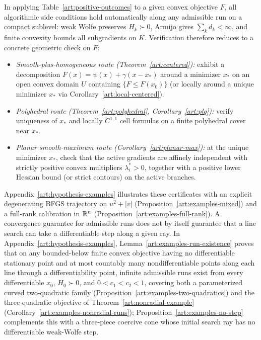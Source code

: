 In applying Table~\ref{art:positive-outcomes} to a given convex objective $F$,
all algorithmic side conditions hold automatically along any admissible run on a
compact sublevel: weak Wolfe preserves $H_k\succ0$, Armijo gives
$\sum_kd_k<\infty$, and finite convexity bounds all subgradients on $K$.
Verification therefore reduces to a concrete geometric check on $F$:
\begin{itemize}
\item \emph{Smooth-plus-homogeneous route (Theorem~\ref{art:centered}):} exhibit
a decomposition $F(x)=\psi(x)+\gamma(x-x_*)$ around a minimizer $x_*$ on an open
convex domain $U$ containing $\{F\le F(x_0)\}$ (or locally around a unique
minimizer $x_*$ via Corollary~\ref{art:local-centered}).
\item \emph{Polyhedral route (Theorem~\ref{art:polyhedral}, Corollary~\ref{art:plq}):}
verify uniqueness of $x_*$ and locally $C^{1,1}$ cell formulas on a finite
polyhedral cover near $x_*$.
\item \emph{Planar smooth-maximum route (Corollary~\ref{art:planar-max}):} at
the unique minimizer $x_*$, check that the active gradients are affinely
independent with strictly positive convex multipliers $\lambda_i^*>0$, together
with a positive lower Hessian bound (or strict contours) on the active branches.
\end{itemize}

Appendix~\ref{art:hypothesis-examples} illustrates these certificates with an
explicit degenerating BFGS trajectory on $u^2+|v|$
(Proposition~\ref{art:examples-mixed}) and a full-rank calibration in $\mathbb R^n$
(Proposition~\ref{art:examples-full-rank}). A convergence guarantee for
admissible runs does not by itself guarantee that a line search can take a
differentiable step along a given ray. In Appendix~\ref{art:hypothesis-examples},
Lemma~\ref{art:examples-run-existence} proves that on any bounded-below finite
convex objective having no differentiable stationary point and at most countably
many nondifferentiable points along each line through a differentiability point,
infinite admissible runs exist from every differentiable $x_0$, $H_0\succ0$, and
$0<c_1<c_2<1$, covering both a parameterized curved two-quadratic family
(Proposition~\ref{art:examples-two-quadratics}) and the three-quadratic
objective of Theorem~\ref{art:nonradial-example}
(Corollary~\ref{art:examples-nonradial-runs}); Proposition~\ref{art:examples-no-step}
complements this with a three-piece coercive cone whose initial search ray has
no differentiable weak-Wolfe step.
